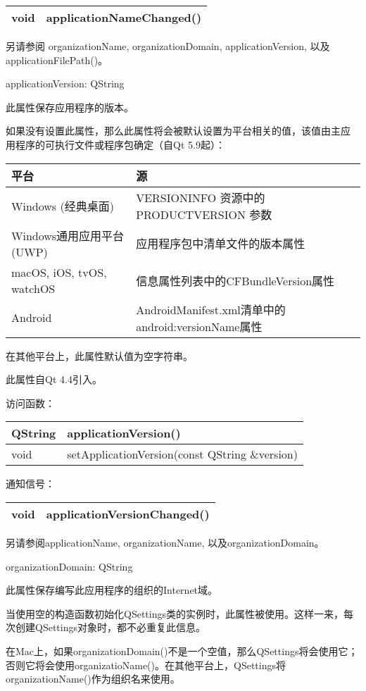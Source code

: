 \begin{tabular}{|l|l|}
\hline
void	&applicationNameChanged()\\
\hline
\end{tabular}

另请参阅 organizationName, organizationDomain, applicationVersion, 以及 applicationFilePath()。

applicationVersion: QString

此属性保存应用程序的版本。

如果没有设置此属性，那么此属性将会被默认设置为平台相关的值，该值由主应
用程序的可执行文件或程序包确定（自Qt 5.9起）：

\begin{tabular}{|l|l|}
\hline
平台	&源\\
\hline
Windows (经典桌面)&	VERSIONINFO 资源中的 PRODUCTVERSION 参数\\
\hline
Windows通用应用平台(UWP)&	应用程序包中清单文件的版本属性\\
\hline
macOS, iOS, tvOS, watchOS&	信息属性列表中的CFBundleVersion属性\\
\hline
Android	&AndroidManifest.xml清单中的android:versionName属性\\
\hline
\end{tabular}

在其他平台上，此属性默认值为空字符串。

此属性自Qt 4.4引入。

访问函数：

\begin{tabular}{|l|l|}
\hline
QString&	applicationVersion()\\
\hline
void&	setApplicationVersion(const QString \&version)\\
\hline
\end{tabular}

通知信号：

\begin{tabular}{|l|l|}
\hline
void	&applicationVersionChanged()\\
\hline
\end{tabular}

另请参阅applicationName, organizationName, 以及organizationDomain。

organizationDomain: QString

此属性保存编写此应用程序的组织的Internet域。

当使用空的构造函数初始化QSettings类的实例时，此属性被使用。这样一来，每次创建QSettings对象时，都不必重复此信息。

在Mac上，如果organizationDomain()不是一个空值，那么QSettings将会使用它；否则它将会使用organizatioName()。在其他平台上，QSettings将organizationName()作为组织名来使用。

